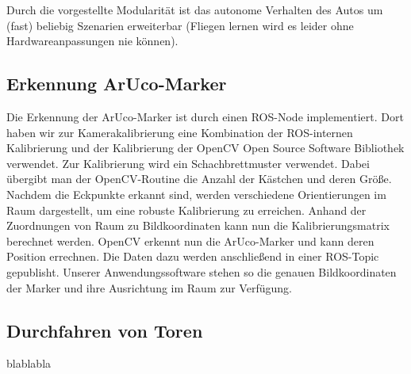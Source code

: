 Durch die vorgestellte Modularität ist das autonome Verhalten des Autos um (fast) beliebig Szenarien erweiterbar (Fliegen lernen wird es leider ohne Hardwareanpassungen nie können).
\subsection{Erkennung ArUco-Marker}
Die Erkennung der ArUco-Marker ist durch einen ROS-Node implementiert. Dort haben wir zur Kamerakalibrierung eine Kombination der ROS-internen Kalibrierung und der Kalibrierung der OpenCV Open Source Software Bibliothek verwendet. Zur Kalibrierung wird ein Schachbrettmuster verwendet. Dabei übergibt man der OpenCV-Routine die Anzahl der Kästchen und deren Größe. Nachdem die Eckpunkte erkannt sind, werden verschiedene Orientierungen im Raum dargestellt, um eine robuste Kalibrierung zu erreichen. Anhand der Zuordnungen von Raum zu Bildkoordinaten kann nun die Kalibrierungsmatrix berechnet werden. 
OpenCV erkennt nun die ArUco-Marker und kann deren Position errechnen. Die Daten dazu werden anschließend in einer ROS-Topic gepublisht. Unserer Anwendungssoftware stehen so die genauen Bildkoordinaten der Marker und ihre Ausrichtung im Raum zur Verfügung.  

\subsection{Durchfahren von Toren}
blablabla